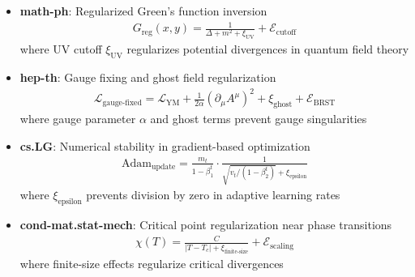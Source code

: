 \begin{theorem}
\begin{itemize}
\item \textbf{math-ph}: Regularized Green's function inversion
  \begin{align}
  G_{\text{reg}}(x, y) = \frac{1}{\Delta + m^2 + \xi_{\text{UV}}} + \mathcal{E}_{\text{cutoff}}
  \end{align}
  where UV cutoff $\xi_{\text{UV}}$ regularizes potential divergences in quantum field theory
  
\item \textbf{hep-th}: Gauge fixing and ghost field regularization
  \begin{align}
  \mathcal{L}_{\text{gauge-fixed}} = \mathcal{L}_{\text{YM}} + \frac{1}{2\alpha}(\partial_\mu A^\mu)^2 + \xi_{\text{ghost}} + \mathcal{E}_{\text{BRST}}
  \end{align}
  where gauge parameter $\alpha$ and ghost terms prevent gauge singularities
  
\item \textbf{cs.LG}: Numerical stability in gradient-based optimization
  \begin{align}
  \text{Adam}_{\text{update}} = \frac{m_t}{1 - \beta_1^t} \cdot \frac{1}{\sqrt{v_t/(1 - \beta_2^t)} + \xi_{\text{epsilon}}}
  \end{align}
  where $\xi_{\text{epsilon}}$ prevents division by zero in adaptive learning rates
  
\item \textbf{cond-mat.stat-mech}: Critical point regularization near phase transitions
  \begin{align}
  \chi(T) = \frac{C}{|T - T_c| + \xi_{\text{finite-size}}} + \mathcal{E}_{\text{scaling}}
  \end{align}
  where finite-size effects regularize critical divergences
\end{itemize}
\end{theorem}

